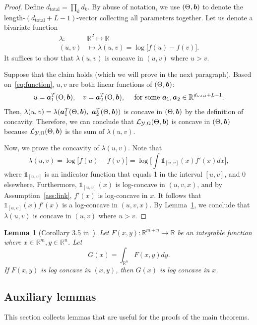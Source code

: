 \documentclass{article}
\theoremstyle{plain}
\newtheorem{lem}{Lemma}
\theoremstyle{definition}
\begin{document}
\begin{proof}
Define $d_{\text{total}}=\prod_k d_k$. By abuse of notation, we use $(\Theta,\bm{b})$ to denote the length-$(d_{\text{total}}+L-1)$-vector collecting all parameters together. Let us denote a bivariate function
\begin{align}
\lambda: &\mathbb{R}^2\mapsto \mathbb{R}\\
(u,v)&\mapsto\lambda(u,v) = \log \big[f(u)-  f(v)\big].
\end{align}
It suffices to show that $\lambda(u,v)$ is concave in $(u,v)$ where $u>v$.

Suppose that the claim holds (which we will prove in the next paragraph). Based on~\eqref{eq:function}, $u,v$ are both linear functions of $(\Theta,\bm{b})$:
\[
u = \bm{a}_1^T(\Theta,\bm{b}), \quad v = \bm{a}_2^T(\Theta,\bm{b}), \quad \text{ for some}\ \bm{a}_1,\bm{a}_2\in \mathbb{R}^{d_{\text{total}}+L-1}.
\]
Then, $\lambda(u,v) = \lambda(\ma_1^T(\Theta,\mb),\ \ma_2^T(\Theta,\mb))$ is concave in $(\Theta,\bm{b})$ by the definition of concavity. Therefore, we can conclude that $\mathcal{L}_{\mathcal{Y},\Omega}(\Theta, \bm{b}) $ is concave in $(\Theta,\bm{b})$ because $\mathcal{L}_{\mathcal{Y},\Omega}(\Theta, \bm{b})$ is the sum of $\lambda(u,v)$.

Now, we prove the concavity of $\lambda(u,v)$. Note that
\begin{equation}
\lambda(u,v) = \log\big[f(u)-f(v)\big]=\log\big[\int\mathds{1}_{[u,v]}(x)f'(x)dx\big],
\end{equation}
where $\mathds{1}_{[u,v]}$ is an indicator function that equals 1 in the interval $[u,v]$, and 0 elsewhere. Furthermore, $\mathds{1}_{[u,v]}(x)$ is log-concave in $(u,v,x)$, and by Assumption~\ref{ass:link}, $f'(x)$ is log-concave in $x$. It follows that $\mathds{1}_{[u,v]}(x)f'(x)$
is a log-concave in $(u,v,x)$. By Lemma~\ref{lem:lossconvexity}, we conclude that $\lambda(u,v)$ is concave in $(u,v)$ where $u>v$.
\end{proof}


\begin{lem}[Corollary 3.5 in~\cite{brascamp2002extensions}]\label{lem:lossconvexity}
Let $F(x,y):\mathbb{R}^{m+n}\rightarrow \mathbb{R}$ be an integrable function where $x\in \mathbb{R}^{m},y\in \mathbb{R}^n$. Let
\[
G(x) = \int_{\mathbb{R}^n}F(x,y)dy.
\]
If $F(x,y)$ is log concave in $(x,y)$, then $G(x)$ is log concave in $x$.
\end{lem}


\subsection{Auxiliary lemmas}\label{sec:lemma}
This section collects lemmas that are useful for the proofs of the main theorems.
\end{document}

